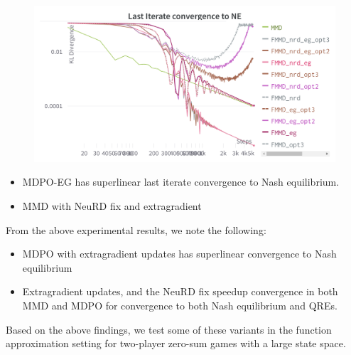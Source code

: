 \begin{figure}[H]
\end{figure}


\begin{figure}[H]
	\includegraphics[width=15cm]{plots/MMD_NE.png}
\end{figure}

\begin{itemize}
	\item{MDPO-EG has superlinear last iterate convergence to Nash
	            equilibrium.
	      }
	\item{MMD with NeuRD fix and extragradient }
\end{itemize}

From the above experimental results, we note the following:

\begin{itemize}
	\item {MDPO with extragradient updates has superlinear convergence to Nash equilibrium}
	\item {Extragradient updates, and the NeuRD fix speedup convergence in both MMD and MDPO for convergence 
	to both Nash equilibrium and QREs.}
\end{itemize}

Based on the above findings, we test some of these variants in the function approximation setting for 
two-player zero-sum games with a large state space.

